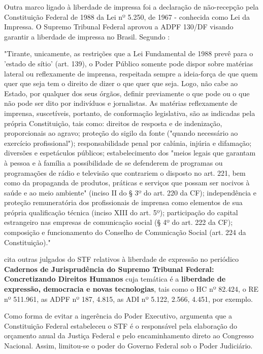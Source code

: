 Outra marco ligado à liberdade de impressa foi a declaração de não-recepção pela Constituição Federal de 1988 da Lei nº 5.250, de 1967 - conhecida como Lei da Impressa. O Supremo Tribunal Federal aprovou a ADPF 130/DF visando garantir a liberdade de impressa no Brasil. Segundo \cite{adpf130}:

\noindent
\begin{flushleft}
\setlength{\leftskip}{4cm}
\small
"Tirante, unicamente, as restrições que a Lei Fundamental de 1988 prevê para o 'estado de sítio' (art. 139), o Poder Público somente pode dispor sobre matérias lateral ou reflexamente de imprensa, respeitada sempre a ideia-força de que quem quer que seja tem o direito de dizer o que quer que seja. Logo, não cabe ao Estado, por qualquer dos seus órgãos, definir previamente o que pode ou o que não pode ser dito por indivíduos e jornalistas. As matérias reflexamente de imprensa, suscetíveis, portanto, de conformação legislativa, são as indicadas pela própria Constituição, tais como: direitos de resposta e de indenização, proporcionais ao agravo; proteção do sigilo da fonte ("quando necessário ao exercício profissional"); responsabilidade penal por calúnia, injúria e difamação; diversões e espetáculos
públicos; estabelecimento dos "meios legais que garantam à pessoa e à família a possibilidade de se defenderem de programas ou programações de rádio e televisão que contrariem o disposto no art. 221, bem como da propaganda de produtos, práticas e serviços que possam ser nocivos à saúde e ao meio ambiente" (inciso II do § 3º
do art. 220 da CF); independência e proteção remuneratória dos profissionais de imprensa como elementos de sua própria qualificação técnica (inciso XIII do art. 5º); participação do capital estrangeiro nas empresas de comunicação social (§ 4º do
art. 222 da CF); composição e funcionamento do Conselho de Comunicação Social (art. 224 da Constituição)." \cite{ado26}
\end{flushleft}

\cite{da2023cadernos} cita outras julgados do STF relativos à liberdade de expressão no periódico \textbf{Cadernos de Jurisprudência do Supremo Tribunal Federal: Concretizando Direitos Humanos} cuja temática é a \textbf{liberdade de expressão, democracia e novas tecnologias}, tais como o HC nº 82.424, o RE nº 511.961, as ADPF nº 187, 4.815, as ADI nº 5.122, 2.566, 4.451, por exemplo.

Como forma de evitar a ingerência do Poder Executivo, \cite{pires2021paradoxo} argumenta que a Constituição Federal estabeleceu o STF é o responsável pela elaboração do orçamento anual da Justiça Federal e pelo encaminhamento direto ao Congresso Nacional. Assim, limitou-se o poder do Governo Federal sob o Poder Judiciário. 

